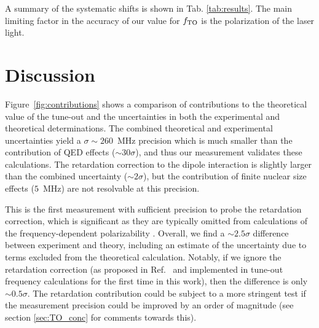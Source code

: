 
	A summary of the systematic shifts is shown in Tab. \ref{tab:results}. 
	The main limiting factor in the accuracy of our value for $f_\mathrm{TO}$ is  the polarization of the laser light. 


\section{Discussion}
\label{sec:TO_discussion}
	Figure~\ref{fig:contributions} shows a comparison of contributions to the theoretical value of the tune-out and the uncertainties in both the experimental and theoretical determinations.
	The combined theoretical and experimental uncertainties yield a  \(\sigma{\sim} 260\)~MHz precision which is much smaller than the contribution of QED effects (\({\sim} 30 \sigma\)), and thus our measurement validates these calculations.
	The retardation correction to the dipole interaction is slightly larger than the combined uncertainty (\({\sim} 2 \sigma\)), but the contribution of finite nuclear size effects (\(5\)~MHz) are not resolvable at this precision. 
	 
	This is the first measurement with sufficient precision to probe the retardation correction, which is significant as they are typically omitted from calculations of the frequency-dependent polarizability \cite{Drake19, Pachucki19}. 
	Overall, we find a \({\sim} 2.5 \sigma\) difference between experiment and theory, including an estimate of the uncertainty due to terms excluded from the theoretical calculation.  
	Notably, if we ignore the retardation correction (as proposed in Ref.~\cite{Pachucki19} and implemented in tune-out frequency calculations for the first time in this work), then the difference is only \({\sim} 0.5 \sigma\).  
	The retardation contribution could be subject to a more stringent test if the measurement precision could be improved by an order of magnitude (see section \ref{sec:TO_conc} for comments towards this).
	
